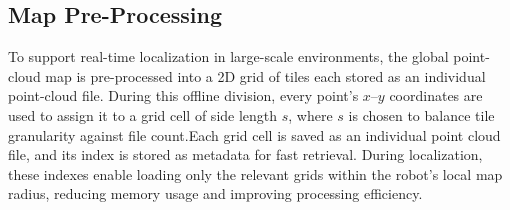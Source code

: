 
\subsection{Map Pre-Processing}

To support real-time localization in large-scale environments, the global point-cloud map is pre-processed into a 2D grid of tiles each stored as an individual point-cloud file. During this offline division, every point’s \(x\)–\(y\) coordinates are used to assign it to a grid cell of side length \(s\), where \(s\) is chosen to balance tile granularity against file count.Each
grid cell is saved as an individual point cloud file, and its index is stored as metadata for fast
retrieval. During localization, these indexes enable loading only the relevant grids within the
robot’s local map radius, reducing memory usage and improving processing efficiency.

